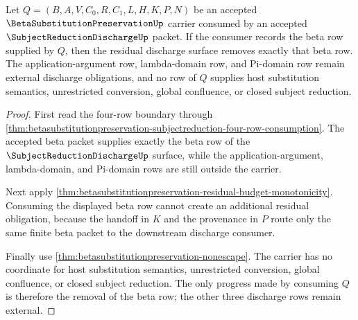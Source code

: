 \begin{theorem}\label{thm:betasubstitutionpreservation-discharge-progress}
Let $Q=(B,A,V,C_0,R,C_1,L,H,K,P,N)$ be an accepted $\BetaSubstitutionPreservationUp$ carrier consumed by an accepted $\SubjectReductionDischargeUp$ packet. If the consumer records the beta row supplied by $Q$, then the residual discharge surface removes exactly that beta row. The application-argument row, lambda-domain row, and Pi-domain row remain external discharge obligations, and no row of $Q$ supplies host substitution semantics, unrestricted conversion, global confluence, or closed subject reduction.
\end{theorem}
\begin{proof}
First read the four-row boundary through \autoref{thm:betasubstitutionpreservation-subjectreduction-four-row-consumption}. The accepted beta packet supplies exactly the beta row of the $\SubjectReductionDischargeUp$ surface, while the application-argument, lambda-domain, and Pi-domain rows are still outside the carrier.

Next apply \autoref{thm:betasubstitutionpreservation-residual-budget-monotonicity}. Consuming the displayed beta row cannot create an additional residual obligation, because the handoff in $K$ and the provenance in $P$ route only the same finite beta packet to the downstream discharge consumer.

Finally use \autoref{thm:betasubstitutionpreservation-nonescape}. The carrier has no coordinate for host substitution semantics, unrestricted conversion, global confluence, or closed subject reduction. The only progress made by consuming $Q$ is therefore the removal of the beta row; the other three discharge rows remain external.
\end{proof}

